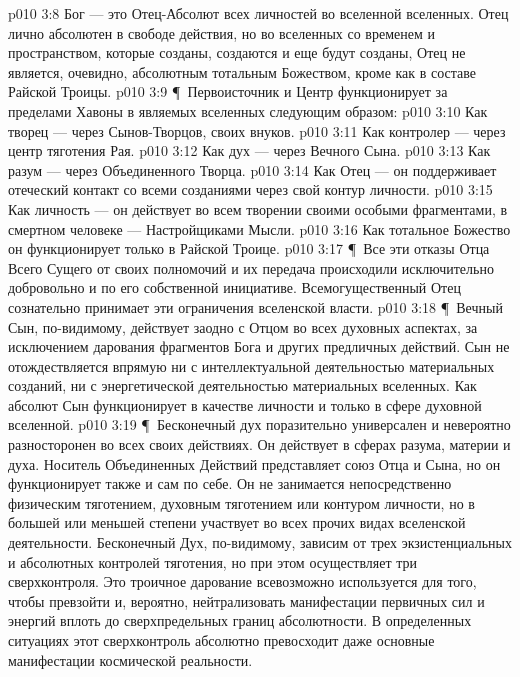 \vs p010 3:8 Бог --- это Отец\hyp{}Абсолют всех личностей во вселенной вселенных. Отец лично абсолютен в свободе действия, но во вселенных со временем и пространством, которые созданы, создаются и еще будут созданы, Отец не является, очевидно, абсолютным тотальным Божеством, кроме как в составе Райской Троицы.
\vs p010 3:9 \P\ Первоисточник и Центр функционирует за пределами Хавоны в являемых вселенных следующим образом:
\vs p010 3:10 \bibnobreakspace Как творец --- через Сынов\hyp{}Творцов, своих внуков.
\vs p010 3:11 \bibnobreakspace Как контролер --- через центр тяготения Рая.
\vs p010 3:12 \bibnobreakspace Как дух --- через Вечного Сына.
\vs p010 3:13 \bibnobreakspace Как разум --- через Объединенного Творца.
\vs p010 3:14 \bibnobreakspace Как Отец --- он поддерживает отеческий контакт со всеми созданиями через свой контур личности.
\vs p010 3:15 \bibnobreakspace Как личность --- он действует  во всем творении своими особыми фрагментами, в смертном человеке --- Настройщиками Мысли.
\vs p010 3:16 \bibnobreakspace Как тотальное Божество он функционирует только в Райской Троице.
\vs p010 3:17 \P\ Все эти отказы Отца Всего Сущего от своих полномочий и их передача происходили исключительно добровольно и по его собственной инициативе. Всемогущественный Отец сознательно принимает эти ограничения вселенской власти.
\vs p010 3:18 \P\ Вечный Сын, по\hyp{}видимому, действует заодно с Отцом во всех духовных аспектах, за исключением дарования фрагментов Бога и других предличных действий. Сын не отождествляется впрямую ни с интеллектуальной деятельностью материальных созданий, ни с энергетической деятельностью материальных вселенных. Как абсолют Сын функционирует в качестве личности и только в сфере духовной вселенной.
\vs p010 3:19 \P\ Бесконечный дух поразительно универсален и невероятно разносторонен во всех своих действиях. Он действует в сферах разума, материи и духа. Носитель Объединенных Действий представляет союз Отца и Сына, но он функционирует также и сам по себе. Он не занимается непосредственно физическим тяготением, духовным тяготением или контуром личности, но в большей или меньшей степени участвует во всех прочих видах вселенской деятельности. Бесконечный Дух, по\hyp{}видимому, зависим от трех экзистенциальных и абсолютных контролей тяготения, но при этом осуществляет три сверхконтроля. Это троичное дарование всевозможно используется для того, чтобы превзойти и, вероятно, нейтрализовать манифестации первичных сил и энергий вплоть до сверхпредельных границ абсолютности. В определенных ситуациях этот сверхконтроль абсолютно превосходит даже основные манифестации космической реальности.
